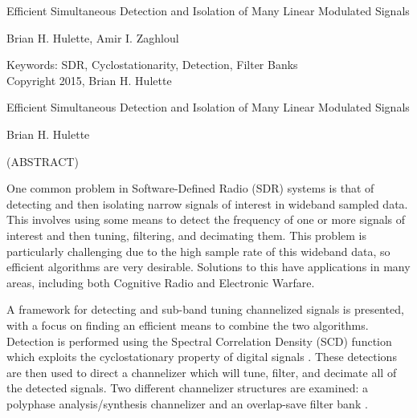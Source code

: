 \documentclass[12pt]{article}
\begin{document}
\newcommand{\fourier}{\mathcal{F}}

\thispagestyle{empty}
\begin{center}

{\large Efficient Simultaneous Detection and Isolation of
Many Linear Modulated Signals}

\vfill

Brian H. Hulette, Amir I. Zaghloul

\vfill

Keywords: SDR, Cyclostationarity, Detection, Filter Banks
\\
Copyright 2015, Brian H. Hulette

\end{center}

\pagebreak

\thispagestyle{empty}
\begin{center}

{\large Efficient Simultaneous Detection and Isolation of
Many Linear Modulated Signals}

\vfill

Brian H. Hulette

\vfill

(ABSTRACT)

\vfill

\end{center}

One common problem in Software-Defined Radio (SDR) systems is that of
detecting and then isolating narrow signals of interest in wideband sampled
data. This involves using some means to detect the frequency of one or more
signals of interest and then tuning, filtering, and decimating them. This
problem is particularly challenging due to the high sample rate of this
wideband data, so efficient algorithms are very desirable. Solutions to this
have applications in many areas, including both Cognitive Radio and
Electronic Warfare.

A framework for detecting and sub-band tuning channelized signals is presented,
with a focus on finding an efficient means to combine the two algorithms.
Detection is performed using the Spectral Correlation Density (SCD) function
which exploits the cyclostationary property of digital signals \cite{Gardner1}.
These detections are then used to direct a channelizer which will tune, filter,
and decimate all of the detected signals. Two different channelizer structures
are examined: a polyphase analysis/synthesis channelizer \cite{Harris1} and an
overlap-save filter bank \cite{Borgerding1}.
\end{document}
